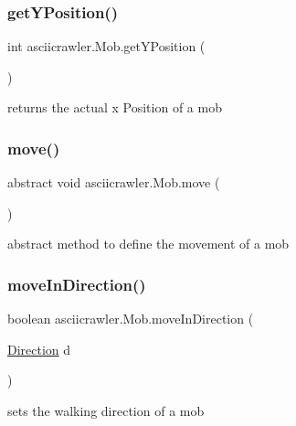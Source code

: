 \subsubsection{\texorpdfstring{get\+Y\+Position()}{getYPosition()}}
{\footnotesize\ttfamily int asciicrawler.\+Mob.\+get\+Y\+Position (\begin{DoxyParamCaption}{ }\end{DoxyParamCaption})\hspace{0.3cm}{\ttfamily [inline]}}

returns the actual x Position of a mob \mbox{\label{classasciicrawler_1_1Mob_a63b3e36b978aa3355d02e4a0b0906b0b}} 
\subsubsection{\texorpdfstring{move()}{move()}}
{\footnotesize\ttfamily abstract void asciicrawler.\+Mob.\+move (\begin{DoxyParamCaption}{ }\end{DoxyParamCaption})\hspace{0.3cm}{\ttfamily [abstract]}}

abstract method to define the movement of a mob \mbox{\label{classasciicrawler_1_1Mob_a2f215e78034f453c0769e04d5676384c}} 
\subsubsection{\texorpdfstring{move\+In\+Direction()}{moveInDirection()}}
{\footnotesize\ttfamily boolean asciicrawler.\+Mob.\+move\+In\+Direction (\begin{DoxyParamCaption}\item[{\hyperlink{enumasciicrawler_1_1Direction}{Direction}}]{d }\end{DoxyParamCaption})\hspace{0.3cm}{\ttfamily [inline]}}

sets the walking direction of a mob \mbox{\label{classasciicrawler_1_1Mob_a5f48e61e860b75d4de72e08321eaefed}} 
